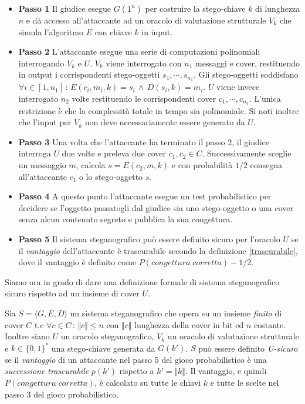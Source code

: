 	\begin{itemize}
	\item \textbf{Passo 1} Il giudice esegue $G(1^{n})$ per costruire la stego-chiave $k$ di lunghezza $n$ e dà accesso all'attaccante ad un oracolo di valutazione strutturale $V_k$ che simula l'algoritmo $E$ con chiave $k$ in input. 
	\item \textbf{Passo 2} L'attaccante esegue una serie di computazioni polinomiali interrogando $V_k$ e $U$. $V_k$ viene interrogato con $n_1$ messaggi e cover, restituendo in output i corrispondenti stego-oggetti $s_1, \cdots , s_{n_1}$. Gli stego-oggetti soddisfano $\forall i \in [1, n_1] \, : \, E(c_i, m_i, k) = s_i \, \wedge \,  D(s_i, k) = m_i$. $U$ viene invece interrogato $n_2$ volte restituendo le corrispondenti cover $c_1,\cdots , c_{n_2}$. L'unica restrizione è che la complessità totale in tempo sia polinomiale. Si noti inoltre che l'input per $V_k$ non deve necessariamente essere generato da $U$.
	\item \textbf{Passo 3} Una volta che l'attaccante ha terminato il passo 2, il giudice interroga $U$ due volte e preleva due cover $c_1,c_2 \in C$. Successivamente sceglie un messaggio $m$, calcola $s = E(c_2, m, k)$ e con probabilità $1/2$ consegna all'attaccante $c_1$ o lo stego-oggetto $s$.
	\item \textbf{Passo 4} A questo punto l'attaccante esegue un test probabilistico per decidere se l'oggetto passatogli dal giudice sia uno stego-oggetto o una cover senza alcun contenuto segreto e pubblica la sua congettura. 
	\item \textbf{Passo 5} Il sistema steganografico può essere definito sicuro per l'oracolo $U$ se il \textit{vantaggio} dell'attaccante è trascurabile secondo la definizione \ref{trascurabile}, dove il vantaggio è definito come $P(congettura \; corretta) - 1/2$.
\end{itemize}
Siamo ora in grado di dare una definizione formale di sistema steganografico sicuro rispetto ad un insieme di cover $U$.
\begin{defn} \label{sistemaSicuro} Sia $S=\langle G,E,D \rangle$ un sistema steganografico che opera su un insieme \textit{finito} di cover $C$ t.c $\forall c \in C \, : \, \Vert c \Vert \leq n $ con $\Vert c \Vert$ lunghezza della cover in bit ed $n$ costante. Inoltre siano $U$ un oracolo steganografico, $V_k$ un oracolo di valutazione strutturale e $k \in \lbrace 0,1 \rbrace ^*$ una stego-chiave generata da $G(k')$. $S$ può essere definito \textit{U-sicuro} se il \textit{vantaggio} di un attaccante nel passo 5 del gioco probabilistico è una \textit{successione trascurabile} $p(k')$ rispetto a $k'=\Vert k \Vert$. Il vantaggio, e quindi $P(congettura \; corretta)$, è calcolato su tutte le chiavi $k$ e tutte le scelte nel passo 3 del gioco probabilistico.  
\end{defn}
